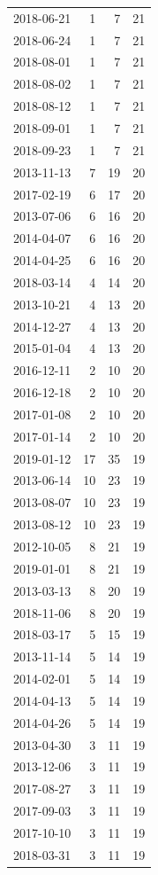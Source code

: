 \begin{tabular}{lrrr}
2018-06-21 & 1 & 7 & 21 \\
2018-06-24 & 1 & 7 & 21 \\
2018-08-01 & 1 & 7 & 21 \\
2018-08-02 & 1 & 7 & 21 \\
2018-08-12 & 1 & 7 & 21 \\
2018-09-01 & 1 & 7 & 21 \\
2018-09-23 & 1 & 7 & 21 \\
2013-11-13 & 7 & 19 & 20 \\
2017-02-19 & 6 & 17 & 20 \\
2013-07-06 & 6 & 16 & 20 \\
2014-04-07 & 6 & 16 & 20 \\
2014-04-25 & 6 & 16 & 20 \\
2018-03-14 & 4 & 14 & 20 \\
2013-10-21 & 4 & 13 & 20 \\
2014-12-27 & 4 & 13 & 20 \\
2015-01-04 & 4 & 13 & 20 \\
2016-12-11 & 2 & 10 & 20 \\
2016-12-18 & 2 & 10 & 20 \\
2017-01-08 & 2 & 10 & 20 \\
2017-01-14 & 2 & 10 & 20 \\
2019-01-12 & 17 & 35 & 19 \\
2013-06-14 & 10 & 23 & 19 \\
2013-08-07 & 10 & 23 & 19 \\
2013-08-12 & 10 & 23 & 19 \\
2012-10-05 & 8 & 21 & 19 \\
2019-01-01 & 8 & 21 & 19 \\
2013-03-13 & 8 & 20 & 19 \\
2018-11-06 & 8 & 20 & 19 \\
2018-03-17 & 5 & 15 & 19 \\
2013-11-14 & 5 & 14 & 19 \\
2014-02-01 & 5 & 14 & 19 \\
2014-04-13 & 5 & 14 & 19 \\
2014-04-26 & 5 & 14 & 19 \\
2013-04-30 & 3 & 11 & 19 \\
2013-12-06 & 3 & 11 & 19 \\
2017-08-27 & 3 & 11 & 19 \\
2017-09-03 & 3 & 11 & 19 \\
2017-10-10 & 3 & 11 & 19 \\
2018-03-31 & 3 & 11 & 19 \\

\end{tabular}
